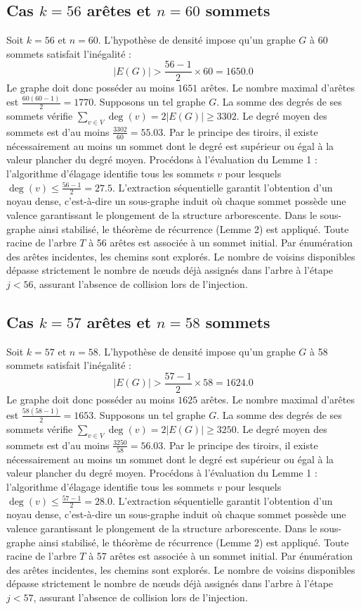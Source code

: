 \documentclass[12pt,a4paper]{article}
\begin{document}
\subsection{Cas $k = 56$ arêtes et $n = 60$ sommets}
Soit $k = 56$ et $n = 60$. L'hypothèse de densité impose qu'un graphe $G$ à 60 sommets satisfait l'inégalité :
$$ |E(G)| > \frac{56-1}{2} \times 60 = 1650.0 $$
Le graphe doit donc posséder au moins $1651$ arêtes. Le nombre maximal d'arêtes est $\frac{60(60-1)}{2} = 1770$.
Supposons un tel graphe $G$. La somme des degrés de ses sommets vérifie $\sum_{v \in V} \deg(v) = 2|E(G)| \geq 3302$.
Le degré moyen des sommets est d'au moins $\frac{3302}{60} = 55.03$.
Par le principe des tiroirs, il existe nécessairement au moins un sommet dont le degré est supérieur ou égal à la valeur plancher du degré moyen.
Procédons à l'évaluation du Lemme 1 : l'algorithme d'élagage identifie tous les sommets $v$ pour lesquels $\deg(v) \leq \frac{56-1}{2} = 27.5$.
L'extraction séquentielle garantit l'obtention d'un noyau dense, c'est-à-dire un sous-graphe induit où chaque sommet possède une valence garantissant le plongement de la structure arborescente.
Dans le sous-graphe ainsi stabilisé, le théorème de récurrence (Lemme 2) est appliqué. Toute racine de l'arbre $T$ à 56 arêtes est associée à un sommet initial. Par énumération des arêtes incidentes, les chemins sont explorés. Le nombre de voisins disponibles dépasse strictement le nombre de nœuds déjà assignés dans l'arbre à l'étape $j < 56$, assurant l'absence de collision lors de l'injection.

\subsection{Cas $k = 57$ arêtes et $n = 58$ sommets}
Soit $k = 57$ et $n = 58$. L'hypothèse de densité impose qu'un graphe $G$ à 58 sommets satisfait l'inégalité :
$$ |E(G)| > \frac{57-1}{2} \times 58 = 1624.0 $$
Le graphe doit donc posséder au moins $1625$ arêtes. Le nombre maximal d'arêtes est $\frac{58(58-1)}{2} = 1653$.
Supposons un tel graphe $G$. La somme des degrés de ses sommets vérifie $\sum_{v \in V} \deg(v) = 2|E(G)| \geq 3250$.
Le degré moyen des sommets est d'au moins $\frac{3250}{58} = 56.03$.
Par le principe des tiroirs, il existe nécessairement au moins un sommet dont le degré est supérieur ou égal à la valeur plancher du degré moyen.
Procédons à l'évaluation du Lemme 1 : l'algorithme d'élagage identifie tous les sommets $v$ pour lesquels $\deg(v) \leq \frac{57-1}{2} = 28.0$.
L'extraction séquentielle garantit l'obtention d'un noyau dense, c'est-à-dire un sous-graphe induit où chaque sommet possède une valence garantissant le plongement de la structure arborescente.
Dans le sous-graphe ainsi stabilisé, le théorème de récurrence (Lemme 2) est appliqué. Toute racine de l'arbre $T$ à 57 arêtes est associée à un sommet initial. Par énumération des arêtes incidentes, les chemins sont explorés. Le nombre de voisins disponibles dépasse strictement le nombre de nœuds déjà assignés dans l'arbre à l'étape $j < 57$, assurant l'absence de collision lors de l'injection.
\end{document}
